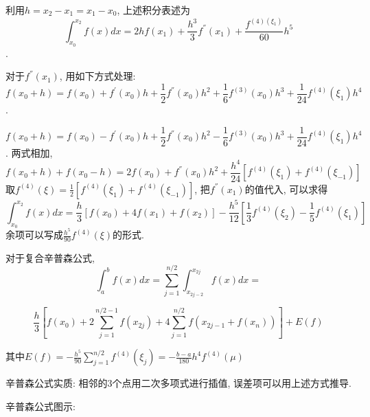 \documentclass{article}
\begin{document}
\begin{CJK*}{UTF8}{song}
					 利用$h=x_2 - x_1 = x_1 - x_0$, 上述积分表述为
					 $$ \int_{x_0}^{x_2} f\left(x\right) dx = 2hf\left(x_1\right) + \frac{h^3}{3}f^{''}\left(x_1\right) + \frac{f^{\left(4\right)\left(\xi_1 \right)}}{60}h^5$$.
					 
					 对于$f^{''}\left(x_1\right)$, 用如下方式处理:
					 $$f\left(x_0+h\right) = f\left(x_0\right) + f^{'}\left(x_0\right)h + \frac{1}{2}f^{''}\left(x_0 \right) h^2 + \frac{1}{6} f^{\left(3\right)}\left(x_0\right)h^3 + \frac{1}{24}f^{\left(4\right)}\left(\xi_1\right)h^4$$.
					 
					 $$f\left(x_0+h\right) = f\left(x_0\right) - f^{'}\left(x_0\right)h + \frac{1}{2}f^{''}\left(x_0 \right) h^2 - \frac{1}{6} f^{\left(3\right)}\left(x_0\right)h^3 + \frac{1}{24}f^{\left(4\right)}\left(\xi_1\right)h^4$$.
					 两式相加,
					 $$ f\left(x_0 + h\right) + f\left(x_0 - h\right) = 2f\left(x_0\right) + f^{''}\left(x_0\right) h^2 + \frac{h^4}{24}\left[f^{\left(4\right)}\left(\xi_1\right) + f^{\left(4\right)}\left(\xi_{-1}\right)\right]$$
					 取$f^{\left(4\right)}\left(\xi\right) = \frac{1}{2}\left[f^{\left(4\right)}\left(\xi_1\right) + f^{\left(4\right)}\left(\xi_{-1}\right)\right]$, 把$f^{''}\left(x_1\right)$的值代入, 可以求得
					 $$\int_{x_0}^{x_2}	f\left(x\right) dx = \frac{h}{3}\left[f\left(x_0\right) + 4f\left(x_1\right) +f\left(x_2\right) \right] - \frac{h^5}{12} \left[\frac{1}{3} f^{\left(4\right)} \left(\xi_2\right) - \frac{1}{5}f^{\left(4\right)}\left(\xi_1\right)\right]$$
					 余项可以写成$\frac{h^5}{90}f^{\left(4\right)}\left(\xi\right)$的形式.
					 
					 对于复合辛普森公式, 
					 $$\int_{a}^{b} f\left(x\right) dx = \sum_{j=1}^{n/2}\int_{x_{2j-2}}^{x_{2j}}f\left(x\right)dx =$$
					 
					 $$ \frac{h}{3}\left[f\left(x_0\right) + 2\sum_{j=1}^{n/2-1}f\left(x_{2j}\right) + 4\sum_{j=1}^{n/2}f\left(x_{2j-1} + f\left(x_n\right)\right)\right] + E\left(f\right)$$
					 
					 其中$E\left(f\right) = -\frac{h^5}{90} \sum_{j=1}^{n/2}f^{\left(4\right)}\left(\xi_j\right) = -\frac{b-a}{180}h^4f^{\left(4\right)}\left(\mu\right)$
					 
					 辛普森公式实质:
					 相邻的3个点用二次多项式进行插值, 误差项可以用上述方式推导.
					 
					 辛普森公式图示:
					 

\end{CJK*}
\end{document}
